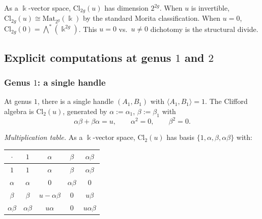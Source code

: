\begin{remark}
As a $\Bbbk$-vector space, $\mathrm{Cl}_{2g}(u)$ has dimension
$2^{2g}$. When $u$ is invertible,
$\mathrm{Cl}_{2g}(u) \cong \mathrm{Mat}_{2^g}(\Bbbk)$ by the
standard Morita classification. When $u = 0$,
$\mathrm{Cl}_{2g}(0) = \bigwedge^*(\Bbbk^{2g})$. This
$u = 0$ vs.\ $u \neq 0$ dichotomy is the structural divide.
\end{remark}

%
%

\subsection{Explicit computations at genus $1$ and $2$}

\subsubsection{Genus $1$: a single handle}

At genus $1$, there is a single handle $(A_1, B_1)$ with
$\langle A_1, B_1 \rangle = 1$. The Clifford algebra is
$\mathrm{Cl}_2(u)$, generated by $\alpha := \alpha_1$,
$\beta := \beta_1$ with
\begin{equation}%
\alpha\beta + \beta\alpha = u,
\qquad
\alpha^2 = 0,
\qquad
\beta^2 = 0.
\end{equation}

\emph{Multiplication table.}\;
As a $\Bbbk$-vector space, $\mathrm{Cl}_2(u)$ has basis
$\{1, \alpha, \beta, \alpha\beta\}$ with:
\begin{center}
\renewcommand{\arraystretch}{1.3}
\begin{tabular}{c|cccc}
$\cdot$ & $1$ & $\alpha$ & $\beta$ & $\alpha\beta$ \\
\hline
$1$ & $1$ & $\alpha$ & $\beta$ & $\alpha\beta$ \\
$\alpha$ & $\alpha$ & $0$ & $\alpha\beta$ & $0$ \\
$\beta$ & $\beta$ & $u - \alpha\beta$ & $0$ & $u\beta$ \\
$\alpha\beta$ & $\alpha\beta$ & $u\alpha$ & $0$ & $u\alpha\beta$
\end{tabular}
\end{center}

